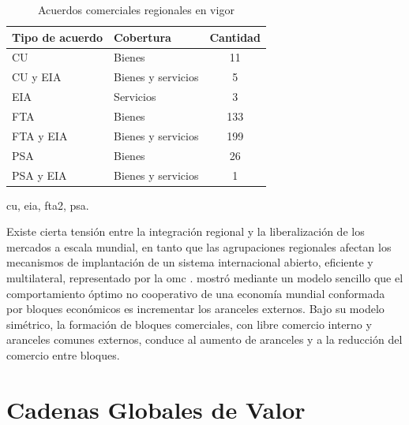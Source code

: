 \begin{table}[h]
	\centering
\begin{threeparttable}
	\caption{Acuerdos comerciales regionales en vigor \parencite{WTO_RTA}}
	\label{Tabla_AcuerdosComerciales}
	\begin{tabular}{llc}
		\hline
		\textbf{Tipo de acuerdo\tnote{a}} & \textbf{Cobertura} & \textbf{Cantidad} \\
		\hline
		CU & Bienes & 11 \\
		CU y EIA & Bienes y servicios & 5 \\
		EIA & Servicios & 3 \\
		FTA & Bienes & 133 \\
		FTA y EIA & Bienes y servicios & 199 \\
		PSA & Bienes & 26 \\
		PSA y EIA & Bienes y servicios & 1 \\
		\hline
	\end{tabular}
	
	\begin{tablenotes}
		\item[a] \footnotesize{\gls{cu}, \gls{eia}, \gls{fta2}, \gls{psa}.}
	\end{tablenotes}
	
\end{threeparttable}
\end{table}

 

Existe cierta tensión entre la integración regional y la liberalización de los mercados a escala mundial, en tanto que las agrupaciones regionales afectan los mecanismos de implantación de un sistema internacional abierto, eficiente y multilateral, representado por la \gls{omc} \parencite[p.~222]{Perez2012}. \textcite{Krugman1992} mostró mediante un modelo sencillo que el comportamiento óptimo no cooperativo de una economía mundial conformada por bloques económicos es incrementar los aranceles externos. Bajo su modelo simétrico, la formación de bloques comerciales, con libre comercio interno y aranceles comunes externos, conduce al aumento de aranceles y a la reducción del comercio entre bloques.

\section{Cadenas Globales de Valor}

